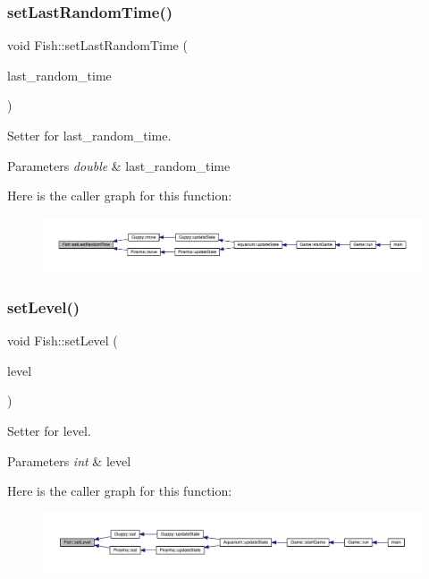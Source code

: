 \subsubsection{\texorpdfstring{set\+Last\+Random\+Time()}{setLastRandomTime()}}
{\footnotesize\ttfamily void Fish\+::set\+Last\+Random\+Time (\begin{DoxyParamCaption}\item[{double}]{last\+\_\+random\+\_\+time }\end{DoxyParamCaption})}



Setter for last\+\_\+random\+\_\+time. 


\begin{DoxyParams}{Parameters}
{\em double} & last\+\_\+random\+\_\+time \\
\hline
\end{DoxyParams}
Here is the caller graph for this function\+:\nopagebreak
\begin{figure}[H]
\begin{center}
\leavevmode
\includegraphics[width=350pt]{class_fish_a883d6bd47ac65d319269eee4c46cf461_icgraph}
\end{center}
\end{figure}
\mbox{\label{class_fish_aee737597ff02a50486c6e2096ccc220d}} 
\subsubsection{\texorpdfstring{set\+Level()}{setLevel()}}
{\footnotesize\ttfamily void Fish\+::set\+Level (\begin{DoxyParamCaption}\item[{int}]{level }\end{DoxyParamCaption})}



Setter for level. 


\begin{DoxyParams}{Parameters}
{\em int} & level \\
\hline
\end{DoxyParams}
Here is the caller graph for this function\+:\nopagebreak
\begin{figure}[H]
\begin{center}
\leavevmode
\includegraphics[width=350pt]{class_fish_aee737597ff02a50486c6e2096ccc220d_icgraph}
\end{center}
\end{figure}


